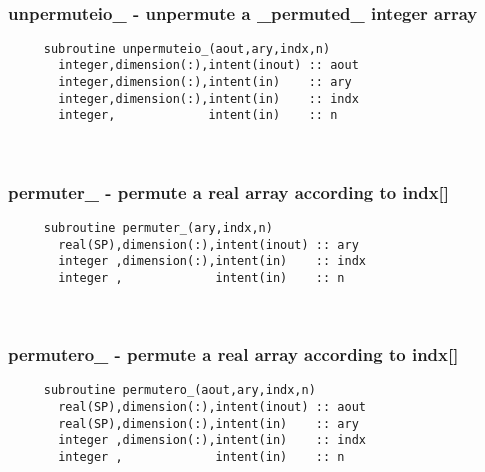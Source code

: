  
\mbox{}\hrulefill\ 
 

  \subsubsection{unpermuteio\_ - unpermute a \_permuted\_ integer array}

\begin{verbatim} 
     subroutine unpermuteio_(aout,ary,indx,n)
       integer,dimension(:),intent(inout) :: aout
       integer,dimension(:),intent(in)    :: ary
       integer,dimension(:),intent(in)    :: indx
       integer,             intent(in)    :: n
 \end{verbatim}%
 
 
\mbox{}\hrulefill\ 
 

  \subsubsection{permuter\_ - permute a real array according to indx[]}

\begin{verbatim} 
     subroutine permuter_(ary,indx,n)
       real(SP),dimension(:),intent(inout) :: ary
       integer ,dimension(:),intent(in)    :: indx
       integer ,             intent(in)    :: n
 \end{verbatim}%
 
 
\mbox{}\hrulefill\ 
 
  \subsubsection{permutero\_ - permute a real array according to indx[]}

\begin{verbatim} 
     subroutine permutero_(aout,ary,indx,n)
       real(SP),dimension(:),intent(inout) :: aout
       real(SP),dimension(:),intent(in)    :: ary
       integer ,dimension(:),intent(in)    :: indx
       integer ,             intent(in)    :: n
 \end{verbatim}%
 
